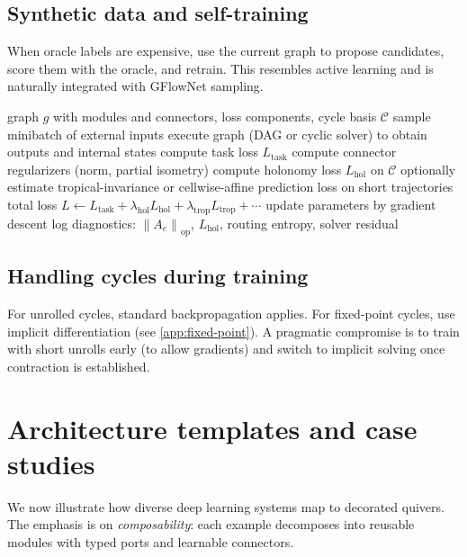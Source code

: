 \documentclass[11pt]{article}
\theoremstyle{definition}
\theoremstyle{plain}
\theoremstyle{remark}
\newcommand{\opnorm}[1]{\left\lVert #1 \right\rVert_{\mathrm{op}}}
\newcommand{\mc}[1]{\mathcal{#1}}
\begin{document}
\subsection{Synthetic data and self-training}
When oracle labels are expensive, use the current graph to propose candidates, score them with the oracle, and retrain.
This resembles active learning and is naturally integrated with GFlowNet sampling.


\begin{algorithm}[t]
\caption{Training a decorated quiver with stability instrumentation}
\label{alg:train}
\begin{algorithmic}[1]
\Require graph $g$ with modules and connectors, loss components, cycle basis $\mc{C}$
  \State sample minibatch of external inputs
  \State execute graph (DAG or cyclic solver) to obtain outputs and internal states
  \State compute task loss $L_{\mathrm{task}}$
  \State compute connector regularizers (norm, partial isometry)
  \State compute holonomy loss $L_{\mathrm{hol}}$ on $\mc{C}$
  \State optionally estimate tropical-invariance or cellwise-affine prediction loss on short trajectories
  \State total loss $L \gets L_{\mathrm{task}} + \lambda_{\mathrm{hol}} L_{\mathrm{hol}} + \lambda_{\mathrm{trop}} L_{\mathrm{trop}} + \cdots$
  \State update parameters by gradient descent
  \State log diagnostics: $\opnorm{A_e}$, $L_{\mathrm{hol}}$, routing entropy, solver residual
\EndFor
\end{algorithmic}
\end{algorithm}

\subsection{Handling cycles during training}
For unrolled cycles, standard backpropagation applies.
For fixed-point cycles, use implicit differentiation (see \cref{app:fixed-point}).
A pragmatic compromise is to train with short unrolls early (to allow gradients) and switch to implicit solving once contraction is established.

\newpage

\section{Architecture templates and case studies}
\label{sec:case-studies}

We now illustrate how diverse deep learning systems map to decorated quivers.
The emphasis is on \emph{composability}: each example decomposes into reusable modules with typed ports and learnable connectors.
\end{document}
